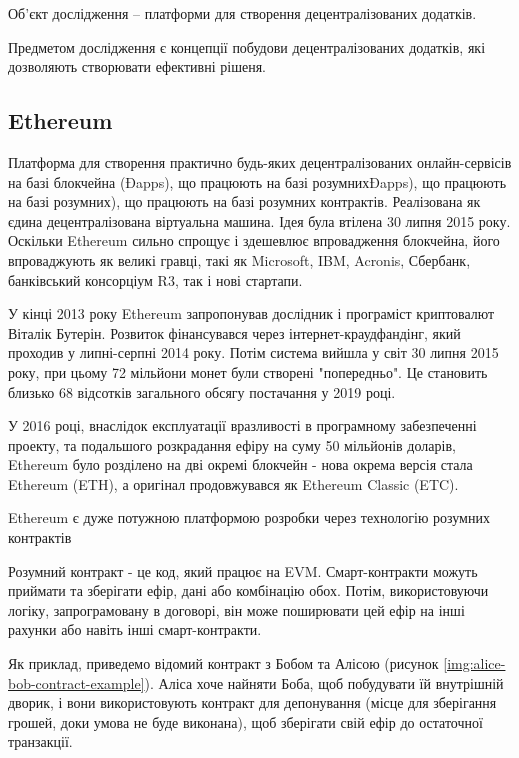 \documentclass{lib/styles/default-style}
\begin{document}
    Об'єкт дослідження – платформи для створення децентралізованих додатків.

    Предметом дослідження є концепції побудови децентралізованих додатків, які дозволяють створювати ефективні рішеня.


\subsection{Ethereum}

    Платформа для створення практично будь-яких децентралізованих
    онлайн-сервісів на базі блокчейна (Đapps), що працюють на базі розумнихĐapps), що працюють на базі розумних), що працюють на базі розумних
    контрактів. Реалізована як єдина децентралізована віртуальна машина. Ідея була
    втілена 30 липня 2015 року. Оскільки Ethereum сильно спрощує і здешевлює
    впровадження блокчейна, його впроваджують як великі гравці, такі як Microsoft, IBM, Acronis,
    Сбербанк, банківський консорціум R3, так і нові стартапи.

    У кінці 2013 року Ethereum запропонував дослідник
    і програміст криптовалют Віталік Бутерін. Розвиток фінансувався через інтернет-краудфандінг, який проходив
    у липні-серпні 2014 року. Потім система вийшла у світ 30 липня 2015 року, при цьому 72 мільйони монет були
    створені "попередньо". Це становить близько 68 відсотків загального обсягу постачання у 2019 році.

    У 2016 році,
    внаслідок експлуатації вразливості в програмному забезпеченні проекту, та подальшого розкрадання ефіру на суму 
    50 мільйонів доларів, Ethereum було розділено на дві окремі блокчейн - нова окрема версія стала Ethereum (ETH), а оригінал продовжувався 
    як Ethereum Classic (ETC).

    Ethereum є дуже потужною платформою розробки через технологію розумних контрактів

    Розумний контракт - це код, який працює на EVM.
    Смарт-контракти можуть приймати та зберігати ефір, дані або комбінацію обох.
    Потім, використовуючи логіку, запрограмовану в договорі, він може поширювати
    цей ефір на інші рахунки або навіть інші смарт-контракти.

    Як приклад, приведемо відомий контракт з Бобом та Алісою (рисунок \ref{img:alice-bob-contract-example}). Аліса хоче найняти Боба, щоб побудувати їй внутрішній дворик,
    і вони використовують контракт для депонування (місце для зберігання грошей, доки умова не буде виконана),
    щоб зберігати свій ефір до остаточної транзакції.
\end{document}
